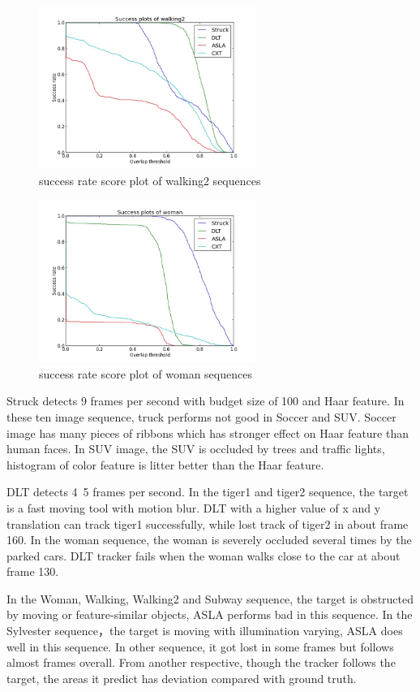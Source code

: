 \documentclass{acm_proc_article-sp}
\begin{document}
\begin{figure}[hbt]
    \includegraphics[width=200pt]{walking2.jpg}
    \caption{success rate score plot of walking2 sequences}
    \label{fig:walking2}
\end{figure}

\begin{figure}[hbt]
  \includegraphics[width=200pt]{woman.jpg}
  \caption{success rate score plot of woman sequences}
  \label{fig:woman}
\end{figure}

Struck detects 9 frames per second with budget size of 100 and Haar feature. In these ten image sequence, truck performs not good in Soccer and SUV. Soccer image has many pieces of ribbons which has stronger effect on Haar feature than human faces. In SUV image, the SUV is occluded by trees and traffic lights, histogram of color feature is litter better than the Haar feature.

DLT detects 4~5 frames per second. In the tiger1 and tiger2 sequence, the target is a fast moving tool with motion blur. DLT with a higher value of x and y translation can track tiger1 successfully, while lost track of tiger2 in about frame 160. In the woman sequence, the woman is severely occluded several times by the parked cars. DLT tracker fails when the woman walks close to the car at about frame 130.

In the Woman, Walking, Walking2 and Subway sequence, the target is obstructed by moving or feature-similar objects, ASLA performs bad in this sequence. In the Sylvester sequence，the target is moving with illumination varying, ASLA does well in this sequence. In other sequence, it got lost in some frames but follows almost frames overall. From another respective,  though the tracker follows the target, the areas it predict has deviation compared with ground truth.
\end{document}
